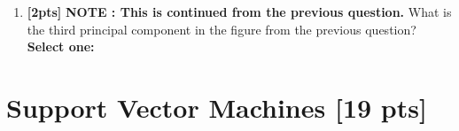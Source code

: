 \documentclass[12pt]{article}
\renewcommand{\circle}{\tikz\draw[black] (0,0) circle (1ex);}
\begin{document}
\begin{enumerate}
\begin{list}{}
    \end{list}
    \item \textbf{[2pts]} \textbf{NOTE : This is continued from the previous question.}
What is the third principal component in the figure from the previous question?
     \textbf{Select one:}
    
    
    
\end{enumerate}\clearpage
\section{Support Vector Machines [19 pts]}
\end{document}

